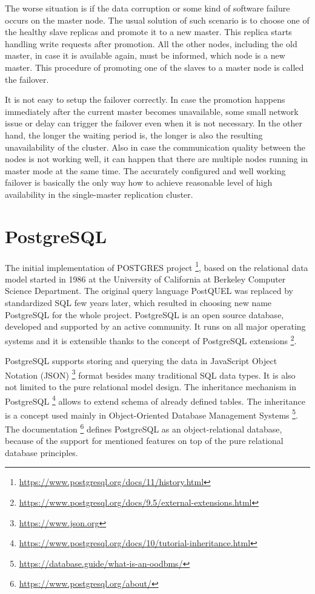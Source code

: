 \documentclass[
  digital, %
  twoside, %
  table,   %
  lof,     %
  lot,     %
]{fithesis3}
\begin{document}
The worse situation is if the data corruption or some kind of software failure occurs on the master node. The usual solution of such scenario is to choose one of the healthy slave replicas and promote it to a new master. This replica starts handling write requests after promotion. All the other nodes, including the old master, in case it is available again, must be informed, which node is a new master. This procedure of promoting one of the slaves to a master node is called the failover.

It is not easy to setup the failover correctly. In case the promotion happens immediately after the current master becomes unavailable, some small network issue or delay can trigger the failover even when it is not necessary. In the other hand, the longer the waiting period is, the longer is also the resulting unavailability of the cluster. Also in case the communication quality between the nodes is not working well, it can happen that there are multiple nodes running in master mode at the same time. The accurately configured and well working failover is basically the only way how to achieve reasonable level of high availability in the single-master replication cluster.

\section{PostgreSQL} \label{sec:postgresql}
The initial implementation of POSTGRES project \footnote{\url{https://www.postgresql.org/docs/11/history.html}}, based on the relational data model started in 1986 at the University of California at Berkeley Computer Science Department. The original query language PostQUEL was replaced by standardized SQL few years later, which resulted in choosing new name PostgreSQL for the whole project. PostgreSQL is an open source database, developed and supported by an active community. It runs on all major operating systems and it is extensible thanks to the concept of PostgreSQL extensions \footnote{\url{https://www.postgresql.org/docs/9.5/external-extensions.html}}.

PostgreSQL supports storing and querying the data in JavaScript Object Notation (JSON) \footnote{\url{https://www.json.org}} format besides many traditional SQL data types. It is also not limited to the pure relational model design. The inheritance mechanism in PostgreSQL \footnote{\url{https://www.postgresql.org/docs/10/tutorial-inheritance.html}} allows to extend schema of already defined tables. The inheritance is a concept used mainly in Object-Oriented Database Management Systems \footnote{\url{https://database.guide/what-is-an-oodbms/}}. The documentation \footnote{\url{https://www.postgresql.org/about/}} defines PostgreSQL as an object-relational database, because of the support for mentioned features on top of the pure relational database principles.
\end{document}
